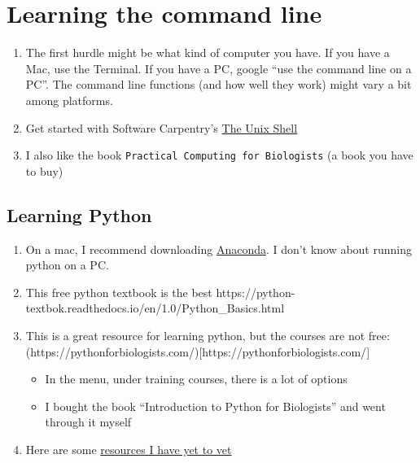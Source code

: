 \documentclass[
  letterpaper,
  DIV=11,
  numbers=noendperiod]{scrreprt}
\begin{document}
\hypertarget{learning-the-command-line}{%
\chapter*{\texorpdfstring{\textbf{Learning the command
line}}{Learning the command line}}\label{learning-the-command-line}}


\begin{enumerate}
\def\labelenumi{\arabic{enumi}.}
\item
  The first hurdle might be what kind of computer you have. If you have
  a Mac, use the Terminal. If you have a PC, google ``use the command
  line on a PC''. The command line functions (and how well they work)
  might vary a bit among platforms.
\item
  Get started with Software Carpentry's
  \href{https://swcarpentry.github.io/shell-novice/}{The Unix Shell}
\item
  I also like the book \texttt{Practical\ Computing\ for\ Biologists} (a
  book you have to buy)
\end{enumerate}

\hypertarget{learning-python}{%
\section*{\texorpdfstring{\textbf{Learning
Python}}{Learning Python}}\label{learning-python}}


\begin{enumerate}
\def\labelenumi{\arabic{enumi}.}
\item
  On a mac, I recommend downloading
  \href{https://www.anaconda.com/}{Anaconda}. I don't know about running
  python on a PC.
\item
  This free python textbook is the best
  https://python-textbok.readthedocs.io/en/1.0/Python\_Basics.html
\item
  This is a great resource for learning python, but the courses are not
  free:
  (https://pythonforbiologists.com/){[}https://pythonforbiologists.com/{]}

  \begin{itemize}
  \item
    In the menu, under training courses, there is a lot of options
  \item
    I bought the book ``Introduction to Python for Biologists'' and went
    through it myself
  \end{itemize}
\item
  Here are some
  \href{https://wiki.python.org/moin/BeginnersGuide/Programmers}{resources
  I have yet to vet}
\end{enumerate}
\end{document}

